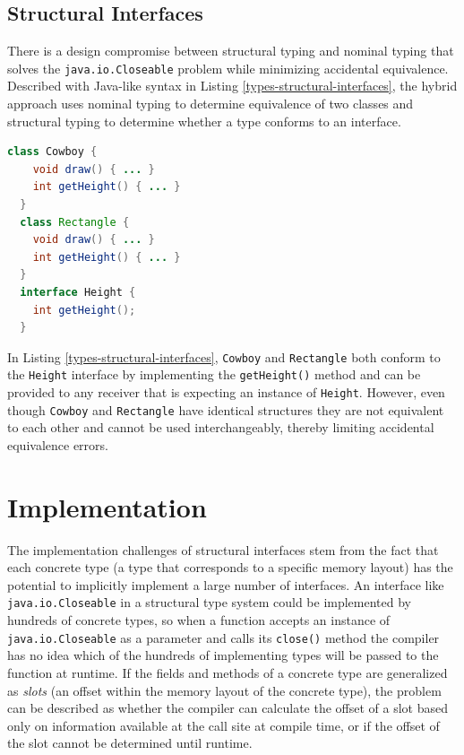\subsection{Structural Interfaces}

There is a design compromise between structural typing and nominal typing that solves the \texttt{java.io.Closeable} problem while minimizing accidental equivalence.  Described with Java-like syntax in Listing \ref{types-structural-interfaces}, the hybrid approach uses nominal typing to determine equivalence of two classes and structural typing to determine whether a type conforms to an interface.

\begin{lstlisting}[language=Java,caption=Structural interface,label=types-structural-interfaces]
  class Cowboy {
    void draw() { ... }
    int getHeight() { ... }
  }
  class Rectangle {
    void draw() { ... }
    int getHeight() { ... }
  }
  interface Height {
    int getHeight();
  }
\end{lstlisting}

In Listing \ref{types-structural-interfaces}, \texttt{Cowboy} and \texttt{Rectangle} both conform to the \texttt{Height} interface by implementing the \texttt{getHeight()} method and can be provided to any receiver that is expecting an instance of \texttt{Height}.  However, even though \texttt{Cowboy} and \texttt{Rectangle} have identical structures they are not equivalent to each other and cannot be used interchangeably, thereby limiting accidental equivalence errors.

\section{Implementation}

The implementation challenges of structural interfaces stem from the fact that each concrete type (a type that corresponds to a specific memory layout) has the potential to implicitly implement a large number of interfaces.  An interface like \texttt{java.io.Closeable} in a structural type system could be implemented by hundreds of concrete types, so when a function accepts an instance of \texttt{java.io.Closeable} as a parameter and calls its \texttt{close()} method the compiler has no idea which of the hundreds of implementing types will be passed to the function at runtime.  If the fields and methods of a concrete type are generalized as \emph{slots} (an offset within the memory layout of the concrete type), the problem can be described as whether the compiler can calculate the offset of a slot based only on information available at the call site at compile time, or if the offset of the slot cannot be determined until runtime.

